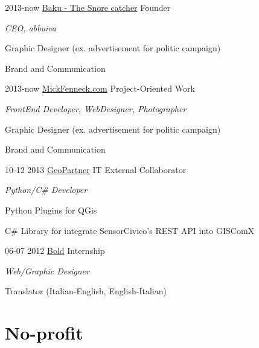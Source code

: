 \documentclass[]{friggeri-cv}
\begin{document}
\begin{entrylist}
\entry
    {2013-now}
    {\href{http://snorecatcher.it/it/benvenuti.html}{Baku - The Snore catcher}}
    {Founder}
    {\emph{CEO, abbuiva}

    {Graphic Designer (ex. advertisement for politic campaign)}

    {Brand and Communication}
    }
\entry
    {2013-now}
    {\href{http://www.mickfenneck.com}{MickFenneck.com}}
    {Project-Oriented Work}
    {\emph{FrontEnd Developer, WebDesigner, Photographer}

	{Graphic Designer (ex. advertisement for politic campaign)}

	{Brand and Communication}

    }
\entry
    {10-12 2013}
    {\href{http://www.geopartner.it}{GeoPartner}}
    {IT External Collaborator}
    {\emph{Python/C\# Developer}

    {Python Plugins for QGis}
    
    {C\# Library for integrate SensorCivico's REST API into GISComX}
    }

\end{entrylist}
\begin{entrylist}
\entry
    {06-07 2012}
    {\href{http://www.studiobold.it}{Bold}}
    {Internship}
    {\emph{Web/Graphic Designer}

    {Translator (Italian-English, English-Italian)}}
\end{entrylist}



\section{No-profit}
\end{document}
